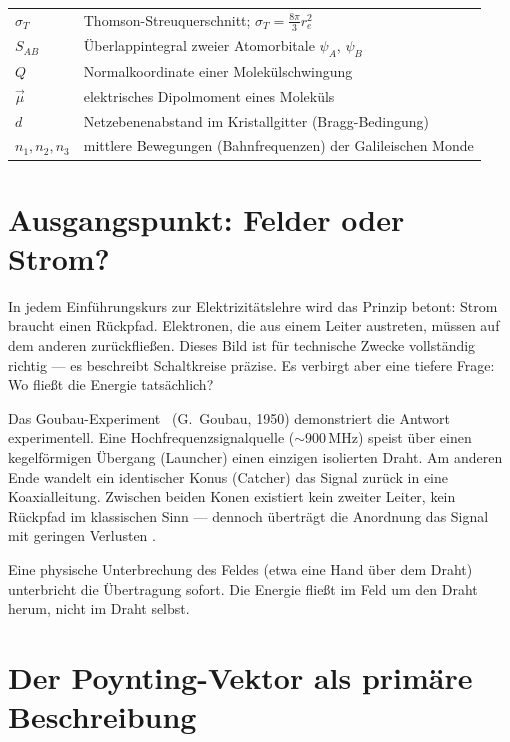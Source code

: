 \begin{longtable}{@{}lp{11cm}@{}}
$\sigma_T$ & Thomson-Streuquerschnitt; $\sigma_T = \tfrac{8\pi}{3}r_e^2$ \\
$S_{AB}$ & Überlappintegral zweier Atomorbitale $\psi_A$, $\psi_B$ \\
$Q$ & Normalkoordinate einer Molekülschwingung \\
$\vec{\mu}$ & elektrisches Dipolmoment eines Moleküls \\
$d$ & Netzebenenabstand im Kristallgitter (Bragg-Bedingung) \\
$n_1, n_2, n_3$ & mittlere Bewegungen (Bahnfrequenzen) der Galileischen Monde \\
\bottomrule
\end{longtable}

\section{Ausgangspunkt: Felder oder Strom?}

In jedem Einführungskurs zur Elektrizitätslehre wird das Prinzip betont:
Strom braucht einen Rückpfad. Elektronen, die aus einem Leiter austreten,
müssen auf dem anderen zurückfließen. Dieses Bild ist für technische Zwecke
vollständig richtig --- es beschreibt Schaltkreise präzise. Es verbirgt aber
eine tiefere Frage: Wo fließt die Energie tatsächlich?

Das Goubau-Experiment \QM\ (G.~Goubau, 1950) demonstriert die Antwort
experimentell. Eine Hochfrequenzsignalquelle (${\sim}900\,\mathrm{MHz}$)
speist über einen kegelförmigen Übergang (Launcher) einen einzigen
isolierten Draht. Am anderen Ende wandelt ein identischer Konus (Catcher)
das Signal zurück in eine Koaxialleitung. Zwischen beiden Konen existiert
kein zweiter Leiter, kein Rückpfad im klassischen Sinn --- dennoch überträgt
die Anordnung das Signal mit geringen Verlusten \cite{Goubau1950}.

Eine physische Unterbrechung des Feldes (etwa eine Hand über dem Draht)
unterbricht die Übertragung sofort. Die Energie fließt im Feld um den Draht
herum, nicht im Draht selbst.

\section{Der Poynting-Vektor als primäre Beschreibung}

